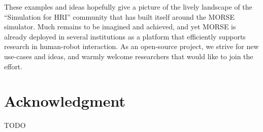 \documentclass[conference]{IEEEtran}
\begin{document}
These examples and ideas hopefully give a picture of the lively landscape of the
``Simulation for HRI'' community that has built itself around the MORSE
simulator. Much remains to be imagined and achieved, and yet MORSE is already
deployed in several institutions as a platform that efficiently supports
research in human-robot interaction. As an open-source project, we strive for
new use-cases and ideas, and warmly welcome researchers that would like to join
the effort.

\section*{Acknowledgment}
TODO



\end{document}
